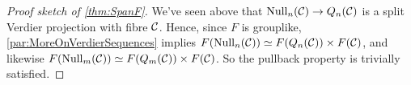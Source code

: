 \documentclass[a4paper, 10pt, oneside, DIV=9, chapterprefix=true, numbers=enddot,bibliography=totoc]{scrbook}
\begin{document}
\begin{proof}[Proof sketch of \cref{thm:SpanF}]
	We've seen above that $\operatorname{Null}_n(\Cc)\morphism Q_n(\Cc)$ is a split Verdier projection with fibre $\mathcal{C}$. Hence, since $F$ is grouplike, \cref{par:MoreOnVerdierSequences} implies $F(\operatorname{Null}_n(\mathcal{C}))\simeq F(Q_n(\mathcal{C}))\times F(\mathcal{C})$, and likewise $F(\operatorname{Null}_m(\mathcal{C}))\simeq F(Q_m(\mathcal{C}))\times F(\mathcal{C})$. So the pullback property is trivially satisfied.
\end{proof}


\backmatter{}
\printbibliography
\end{document}
